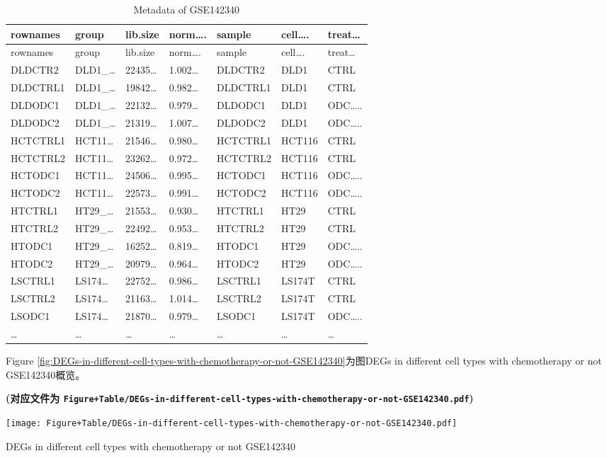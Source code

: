 \documentclass[
]{article}
\begin{document}
\begin{longtable}[]{@{}lllllll@{}}
\caption{\label{tab:metadata-of-GSE142340}Metadata of GSE142340}\tabularnewline
\toprule
rownames & group & lib.size & norm\ldots. & sample & cell\ldots. & treat\ldots{}\tabularnewline
\midrule
\endfirsthead
\toprule
rownames & group & lib.size & norm\ldots. & sample & cell\ldots. & treat\ldots{}\tabularnewline
\midrule
\endhead
DLDCTR2 & DLD1\_\ldots{} & 22435\ldots{} & 1.002\ldots{} & DLDCTR2 & DLD1 & CTRL\tabularnewline
DLDCTRL1 & DLD1\_\ldots{} & 19842\ldots{} & 0.982\ldots{} & DLDCTRL1 & DLD1 & CTRL\tabularnewline
DLDODC1 & DLD1\_\ldots{} & 22132\ldots{} & 0.979\ldots{} & DLDODC1 & DLD1 & ODC\ldots..\tabularnewline
DLDODC2 & DLD1\_\ldots{} & 21319\ldots{} & 1.007\ldots{} & DLDODC2 & DLD1 & ODC\ldots..\tabularnewline
HCTCTRL1 & HCT11\ldots{} & 21546\ldots{} & 0.980\ldots{} & HCTCTRL1 & HCT116 & CTRL\tabularnewline
HCTCTRL2 & HCT11\ldots{} & 23262\ldots{} & 0.972\ldots{} & HCTCTRL2 & HCT116 & CTRL\tabularnewline
HCTODC1 & HCT11\ldots{} & 24506\ldots{} & 0.995\ldots{} & HCTODC1 & HCT116 & ODC\ldots..\tabularnewline
HCTODC2 & HCT11\ldots{} & 22573\ldots{} & 0.991\ldots{} & HCTODC2 & HCT116 & ODC\ldots..\tabularnewline
HTCTRL1 & HT29\_\ldots{} & 21553\ldots{} & 0.930\ldots{} & HTCTRL1 & HT29 & CTRL\tabularnewline
HTCTRL2 & HT29\_\ldots{} & 22492\ldots{} & 0.953\ldots{} & HTCTRL2 & HT29 & CTRL\tabularnewline
HTODC1 & HT29\_\ldots{} & 16252\ldots{} & 0.819\ldots{} & HTODC1 & HT29 & ODC\ldots..\tabularnewline
HTODC2 & HT29\_\ldots{} & 20979\ldots{} & 0.964\ldots{} & HTODC2 & HT29 & ODC\ldots..\tabularnewline
LSCTRL1 & LS174\ldots{} & 22752\ldots{} & 0.986\ldots{} & LSCTRL1 & LS174T & CTRL\tabularnewline
LSCTRL2 & LS174\ldots{} & 21163\ldots{} & 1.014\ldots{} & LSCTRL2 & LS174T & CTRL\tabularnewline
LSODC1 & LS174\ldots{} & 21870\ldots{} & 0.979\ldots{} & LSODC1 & LS174T & ODC\ldots..\tabularnewline
\ldots{} & \ldots{} & \ldots{} & \ldots{} & \ldots{} & \ldots{} & \ldots{}\tabularnewline
\bottomrule
\end{longtable}

Figure \ref{fig:DEGs-in-different-cell-types-with-chemotherapy-or-not-GSE142340}为图DEGs in different cell types with chemotherapy or not GSE142340概览。

\textbf{(对应文件为 \texttt{Figure+Table/DEGs-in-different-cell-types-with-chemotherapy-or-not-GSE142340.pdf})}

\def\@captype{figure}
\begin{center}
\texttt{[image: Figure+Table/DEGs-in-different-cell-types-with-chemotherapy-or-not-GSE142340.pdf]}
\caption{DEGs in different cell types with chemotherapy or not GSE142340}\label{fig:DEGs-in-different-cell-types-with-chemotherapy-or-not-GSE142340}
\end{center}
\end{document}
